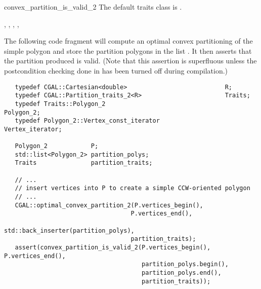 \begin{ccRefFunction}{convex_partition_is_valid_2}
The default traits class  is .%

\ccSeeAlso

,
,
,
,

\ccExample

The following code fragment will compute an optimal
convex partitioning of the simple polygon  
and store the partition polygons in the list .
It then asserts that the partition produced is valid. 
(Note that this assertion is superfluous unless the postcondition checking
done in  has been turned off during
compilation.)

\begin{verbatim}
   typedef CGAL::Cartesian<double>                           R;
   typedef CGAL::Partition_traits_2<R>                       Traits;
   typedef Traits::Polygon_2                                 Polygon_2;
   typedef Polygon_2::Vertex_const_iterator                  Vertex_iterator;

   Polygon_2            P;
   std::list<Polygon_2> partition_polys;
   Traits               partition_traits;

   // ...
   // insert vertices into P to create a simple CCW-oriented polygon
   // ...
   CGAL::optimal_convex_partition_2(P.vertices_begin(),
                                   P.vertices_end(),
                                   std::back_inserter(partition_polys),
                                   partition_traits);
   assert(convex_partition_is_valid_2(P.vertices_begin(), P.vertices_end(),
                                      partition_polys.begin(), 
                                      partition_polys.end(),
                                      partition_traits));
\end{verbatim}

\end{ccRefFunction}
\renewcommand\ccRefPageBegin{\ccParDims\cgalColumnLayout}
\renewcommand\ccRefPageEnd{\ccParDims\cgalColumnLayout}
